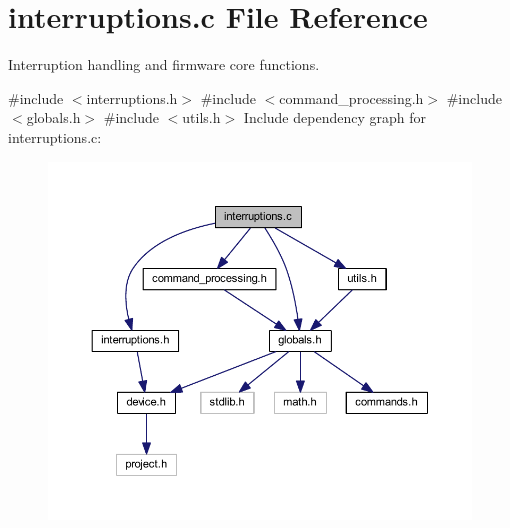 \section{interruptions.\+c File Reference}
\label{interruptions_8c}


Interruption handling and firmware core functions.  


{\ttfamily \#include $<$interruptions.\+h$>$}\newline
{\ttfamily \#include $<$command\+\_\+processing.\+h$>$}\newline
{\ttfamily \#include $<$globals.\+h$>$}\newline
{\ttfamily \#include $<$utils.\+h$>$}\newline
Include dependency graph for interruptions.\+c\+:\nopagebreak
\begin{figure}[H]
\begin{center}
\leavevmode
\includegraphics[width=350pt]{interruptions_8c__incl}
\end{center}
\end{figure}
